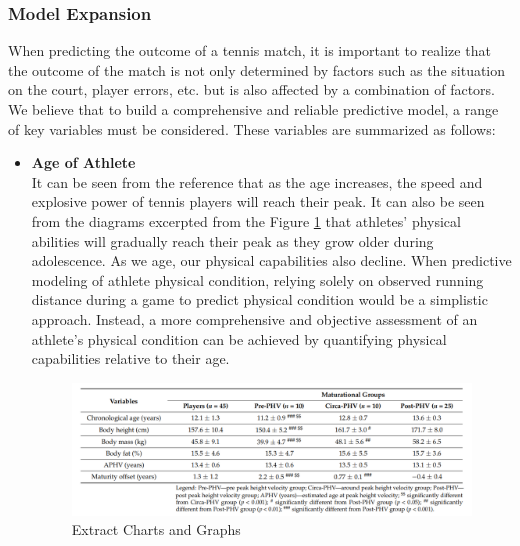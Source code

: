 \subsubsection{Model Expansion}
When predicting the outcome of a tennis match, it is important to realize that the outcome of the match is not only determined by factors such as the situation on the court, player errors, etc. but is also affected by a combination of factors. We believe that to build a comprehensive and reliable predictive model, a range of key variables must be considered. These variables are summarized as follows:
\begin{itemize}
    \item \textbf{Age of Athlete}\\
    It can be seen from the reference \cite{ref3} that as the age increases, the speed and explosive power of tennis players will reach their peak. It can also be seen from the diagrams excerpted from the Figure \ref{fig:ECAG} that athletes' physical abilities will gradually reach their peak as they grow older during adolescence. As we age, our physical capabilities also decline. When predictive modeling of athlete physical condition, relying solely on observed running distance during a game to predict physical condition would be a simplistic approach. Instead, a more comprehensive and objective assessment of an athlete's physical condition can be achieved by quantifying physical capabilities relative to their age.
    \begin{figure}[b!]
        \centering
        \includegraphics[width=0.75\linewidth]{figure/d021c08d7368ca795e638142b768207.png}
        \caption{\centering Extract Charts and Graphs}
        \label{fig:ECAG}
    \end{figure}


\end{itemize}
